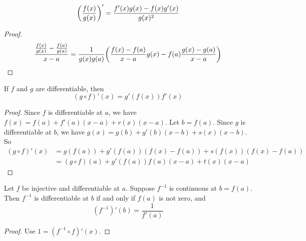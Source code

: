 \begin{theorem}
    \begin{equation}
        \mleft( \frac{f(x)}{g(x)} \mright)' = \frac{f'(x)g(x) - f(x) g'(x)}{g(x)^2}
    \end{equation}    
\end{theorem}
\begin{proof}
    \begin{equation}
        \frac{\frac{f(x)}{g(x)} - \frac{f(a)}{g(a)}}{x - a} = \frac{1}{g(x) g(a)} \mleft( \frac{f(x) - f(a)}{x-a} g(x) - f(a) \frac{g(x) - g(a)}{x-a} \mright)
    \end{equation}
\end{proof}

\begin{theorem}
    If $f$ and $g$ are differentiable, then
    \begin{equation}
        (g \circ f)'(x) = g'(f(x)) f'(x)
    \end{equation}    
\end{theorem}
\begin{proof}
    Since $f$ is differentiable at $a$, we have $f(x) = f(a) + f'(a)(x-a) + r(x)(x-a)$. Let $b = f(a)$. Since $g$ is differentiable at $b$, we have $g(x) = g(b) + g'(b)(x-b) + s(x)(x-b)$. So
    \begin{equation}
        \begin{aligned}
            (g \circ f)'(x) &= g(f(a)) + g'(f(a))(f(x) - f(a)) + s(f(x))(f(x) - f(a)) \\
            &= (g \circ f)(a) + g'(f(a))f(a)(x-a) + t(x)(x-a)
        \end{aligned}
    \end{equation}
\end{proof}

\begin{theorem}
    Let $f$ be injective and differentiable at $a$. Suppose $f^{-1}$ is continuous at $b=f(a)$. Then $f^{-1}$ is differentiable at $b$ if and only if $f(a)$ is not zero, and
    \begin{equation}
        (f^{-1})'(b) = \frac{1}{f'(a)}
    \end{equation}
\end{theorem}
\begin{proof}
    Use $1 = (f^{-1} \circ f)'(x)$.
\end{proof}


